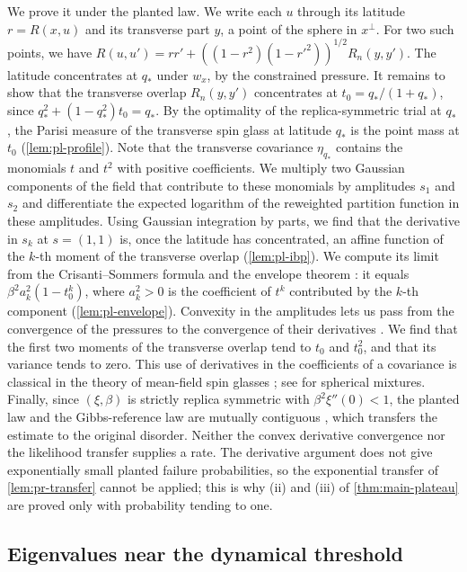 We prove it under the planted law. We write each $u$ through its latitude $r=R(x,u)$ and its transverse part $y$, a point of the sphere in $x^\perp$. For two such points, we have $R(u,u')=rr'+((1-r^2)(1-r'^2))^{1/2}R_n(y,y')$. The latitude concentrates at $q_*$ under $w_x$, by the constrained pressure. It remains to show that the transverse overlap $R_n(y,y')$ concentrates at $t_0=q_*/(1+q_*)$, since $q_*^2+(1-q_*^2)t_0=q_*$. By the optimality of the replica-symmetric trial at $q_*$, the Parisi measure of the transverse spin glass at latitude $q_*$ is the point mass at $t_0$ (\cref{lem:pl-profile}). Note that the transverse covariance $\eta_{q_*}$ contains the monomials $t$ and $t^2$ with positive coefficients. We multiply two Gaussian components of the field that contribute to these monomials by amplitudes $s_1$ and $s_2$ and differentiate the expected logarithm of the reweighted partition function in these amplitudes. Using Gaussian integration by parts, we find that the derivative in $s_k$ at $s=(1,1)$ is, once the latitude has concentrated, an affine function of the $k$-th moment of the transverse overlap (\cref{lem:pl-ibp}). We compute its limit from the Crisanti--Sommers formula and the envelope theorem \cite{MilgromSegal2002}: it equals $\beta^2a_k^2(1-t_0^k)$, where $a_k^2>0$ is the coefficient of $t^k$ contributed by the $k$-th component (\cref{lem:pl-envelope}). Convexity in the amplitudes lets us pass from the convergence of the pressures to the convergence of their derivatives \cite[Theorem~24.5]{Rockafellar1970}. We find that the first two moments of the transverse overlap tend to $t_0$ and $t_0^2$, and that its variance tends to zero. This use of derivatives in the coefficients of a covariance is classical in the theory of mean-field spin glasses \cite{Panchenko2008}; see \cite[Proposition~2.2]{AuffingerElAlaouiSellke2025} for spherical mixtures. Finally, since $(\xi,\beta)$ is strictly replica symmetric with $\beta^2\xi''(0)<1$, the planted law and the Gibbs-reference law are mutually contiguous \cite[Lemma~3.2, Remark~3.3, and Corollary~3.5]{HuangMontanariPham2024}, which transfers the estimate to the original disorder. Neither the convex derivative convergence nor the likelihood transfer supplies a rate. The derivative argument does not give exponentially small planted failure probabilities, so the exponential transfer of \cref{lem:pr-transfer} cannot be applied; this is why (ii) and (iii) of \cref{thm:main-plateau} are proved only with probability tending to one.

\subsection{Eigenvalues near the dynamical threshold}\label{sec:ov-cusp}


